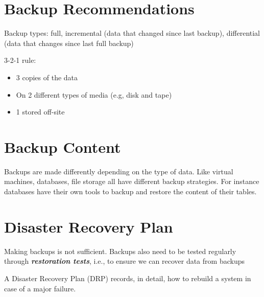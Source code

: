 \documentclass[11pt]{article}
\begin{document}
\section*{Backup Recommendations}

Backup types: full, incremental (data that changed since last backup), differential (data that changes since last full backup)

3-2-1 rule:
\begin{itemize}
	\item 3 copies of the data
	\item On 2 different types of media (e.g, disk and tape)
	\item 1 stored off-site
\end{itemize}

\section*{Backup Content}

Backups are made differently depending on the type of data. Like virtual machines, databases, file storage all have different backup strategies. For instance databases have their own tools to backup and restore the content of their tables. 


\section*{Disaster Recovery Plan}

Making backups is not sufficient. Backups also need to be tested regularly through \textit{\textbf{restoration tests}}, i.e., to ensure we can recover data from backups

A Disaster Recovery Plan (DRP) records, in detail, how to rebuild a system in case of a major failure. 
\end{document}
